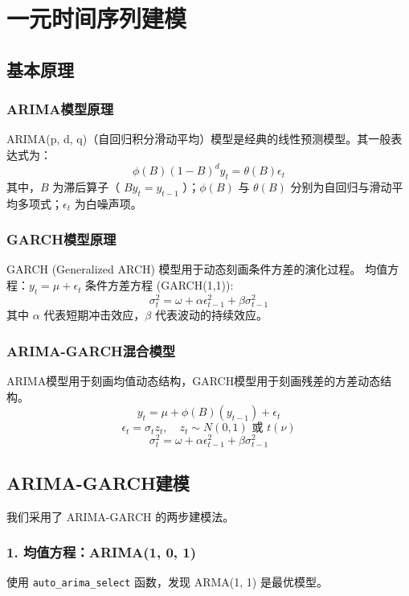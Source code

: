 \documentclass[a4paper]{ctexart}
\begin{document}
	\section{一元时间序列建模}
	\subsection{基本原理}
	\subsubsection{ARIMA模型原理}
	ARIMA(p, d, q)（自回归积分滑动平均）模型是经典的线性预测模型。其一般表达式为：
	$$ \phi(B)(1-B)^d y_t = \theta(B)\epsilon_t $$
	其中，$B$ 为滞后算子（ $By_t = y_{t-1}$ ）；$\phi(B)$ 与 $\theta(B)$ 分别为自回归与滑动平均多项式；$\epsilon_t$ 为白噪声项。
	
	\subsubsection{GARCH模型原理}
	GARCH (Generalized ARCH) 模型用于动态刻画条件方差的演化过程。
	均值方程：$ y_t = \mu + \epsilon_t $
	条件方差方程 (GARCH(1,1)):
	$$ \sigma_t^2 = \omega + \alpha \epsilon_{t-1}^2 + \beta \sigma_{t-1}^2 $$
	其中 $\alpha$ 代表短期冲击效应，$\beta$ 代表波动的持续效应。
	
	\subsubsection{ARIMA-GARCH混合模型}
	ARIMA模型用于刻画均值动态结构，GARCH模型用于刻画残差的方差动态结构。
	$$ y_t = \mu + \phi(B)(y_{t-1}) + \epsilon_t $$
	$$ \epsilon_t = \sigma_t z_t, \quad z_t \sim N(0,1) \text{ 或 } t(\nu) $$
	$$ \sigma_t^2 = \omega + \alpha \epsilon_{t-1}^2 + \beta \sigma_{t-1}^2 $$
	
	\subsection{ARIMA-GARCH建模}
	我们采用了 ARIMA-GARCH 的两步建模法。
	
	\subsubsection{1. 均值方程：ARIMA(1, 0, 1)}
	使用 \texttt{auto\_arima\_select} 函数，发现 ARMA(1, 1) 是最优模型。
	
\end{document}
